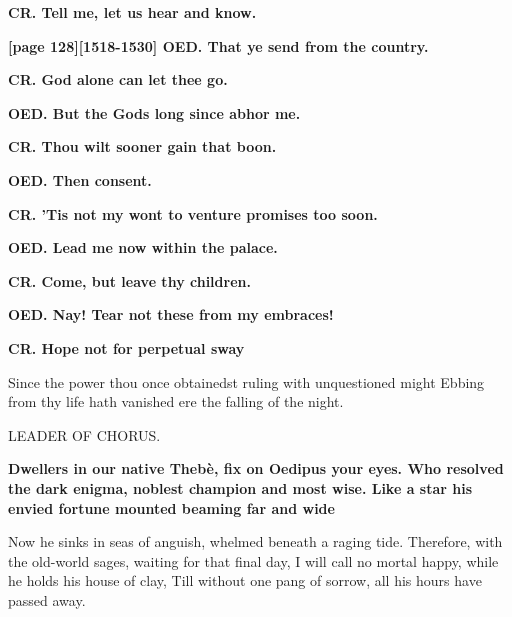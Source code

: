 \documentclass[11pt,letter]{book}
\begin{document}
\par \textbf{CR. Tell me, let us hear and know.}
\par 

\par \textbf{[page 128][1518-1530] OED. That ye send from the country.}
\par 

\par \textbf{CR. God alone can let thee go.}
\par 

\par \textbf{OED. But the Gods long since abhor me.}
\par 

\par \textbf{CR. Thou wilt sooner gain that boon.}
\par 

\par \textbf{OED. Then consent.}
\par 

\par \textbf{CR. ’Tis not my wont to venture promises too soon.}
\par 

\par \textbf{OED. Lead me now within the palace.}
\par 

\par \textbf{CR. Come, but leave thy children.}
\par 

\par \textbf{OED. Nay! Tear not these from my embraces!}
\par 

\par \textbf{CR. Hope not for perpetual sway}
\par   Since the power thou once obtainedst ruling with unquestioned might Ebbing from thy life hath vanished ere the falling of the night.

\par  LEADER OF CHORUS.

\par \textbf{Dwellers in our native Thebè, fix on Oedipus your eyes. Who resolved the dark enigma, noblest champion and most wise. Like a star his envied fortune mounted beaming far and wide}
\par   Now he sinks in seas of anguish, whelmed beneath a raging tide. Therefore, with the old-world sages, waiting for that final day, I will call no mortal happy, while he holds his house of clay, Till without one pang of sorrow, all his hours have passed away.
\end{document}
